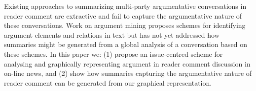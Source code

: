 Existing approaches to summarizing multi-party argumentative conversations in reader comment are extractive and fail to capture the argumentative nature of these conversations. Work on argument mining proposes schemes for identifying argument elements and relations in text but has not yet addressed how summaries might be generated from a global analysis of a conversation based on these schemes. In this paper we: (1) propose an issue-centred scheme for analysing and graphically representing argument in reader comment discussion in on-line news, and (2) show how summaries capturing the argumentative nature of reader comment can be generated from our graphical representation.
